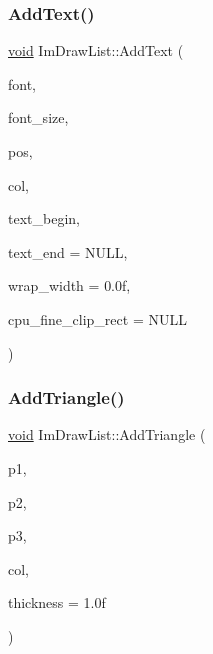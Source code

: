 \mbox{\label{structImDrawList_a0a226cbe9bb1480428e145d8535cda26}} 
\subsubsection{\texorpdfstring{Add\+Text()}{AddText()}\hspace{0.1cm}{\footnotesize\ttfamily [2/2]}}
{\footnotesize\ttfamily \hyperlink{imgui__impl__opengl3__loader_8h_ac668e7cffd9e2e9cfee428b9b2f34fa7}{void} Im\+Draw\+List\+::\+Add\+Text (\begin{DoxyParamCaption}\item[{const \hyperlink{structImFont}{Im\+Font} $\ast$}]{font,  }\item[{float}]{font\+\_\+size,  }\item[{const \hyperlink{structImVec2}{Im\+Vec2} \&}]{pos,  }\item[{Im\+U32}]{col,  }\item[{const char $\ast$}]{text\+\_\+begin,  }\item[{const char $\ast$}]{text\+\_\+end = {\ttfamily NULL},  }\item[{float}]{wrap\+\_\+width = {\ttfamily 0.0f},  }\item[{const \hyperlink{structImVec4}{Im\+Vec4} $\ast$}]{cpu\+\_\+fine\+\_\+clip\+\_\+rect = {\ttfamily NULL} }\end{DoxyParamCaption})}

\mbox{\label{structImDrawList_a04bde432891d0392e7d98d957c1fd9b3}} 
\subsubsection{\texorpdfstring{Add\+Triangle()}{AddTriangle()}}
{\footnotesize\ttfamily \hyperlink{imgui__impl__opengl3__loader_8h_ac668e7cffd9e2e9cfee428b9b2f34fa7}{void} Im\+Draw\+List\+::\+Add\+Triangle (\begin{DoxyParamCaption}\item[{const \hyperlink{structImVec2}{Im\+Vec2} \&}]{p1,  }\item[{const \hyperlink{structImVec2}{Im\+Vec2} \&}]{p2,  }\item[{const \hyperlink{structImVec2}{Im\+Vec2} \&}]{p3,  }\item[{Im\+U32}]{col,  }\item[{float}]{thickness = {\ttfamily 1.0f} }\end{DoxyParamCaption})}

